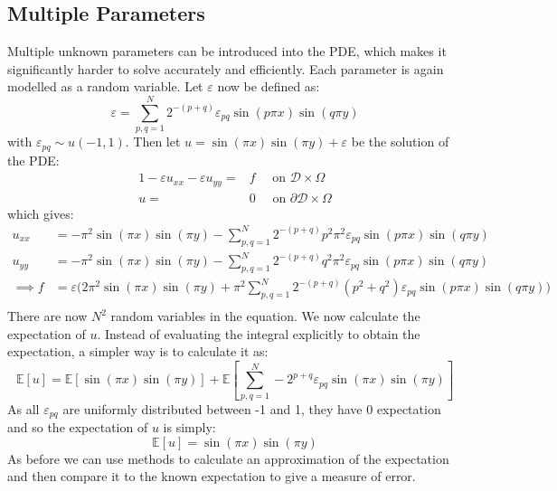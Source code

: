 \documentclass[11pt]{article}
\numberwithin{equation}{section}
\begin{document}
\subsection{Multiple Parameters}
Multiple unknown parameters can be introduced into the PDE, which makes it significantly harder to solve accurately and efficiently. Each parameter is again modelled as a random variable. Let $\varepsilon$ now be defined as:
\begin{equation}
\varepsilon = \sum_{p,q = 1}^N 2^{-(p+q)} \varepsilon_{pq} \sin(p \pi x) \sin(q \pi y)
\end{equation}
with $\varepsilon_{pq} \sim u(-1,1)$. Then let $u = \sin(\pi x)\sin(\pi y) + \varepsilon$ be the solution of the PDE:
\begin{alignat}{1}
-\varepsilon u_{xx} -\varepsilon u_{yy} = {}& f \quad \text{ on } \mathcal{D} \times \Omega \nonumber \\
u = {}& 0 \quad \text{ on } \partial \mathcal{D} \times \Omega
\end{alignat}
which gives:
\begin{equation}
\begin{split}
u_{xx} &= -\pi^2 \sin(\pi x)\sin(\pi y) - \sum_{p,q=1}^N 2^{-(p+q)} p^2 \pi^2 \varepsilon_{pq} \sin(p\pi x)\sin(q\pi y) \\
u_{yy} &= -\pi^2 \sin(\pi x)\sin(\pi y) - \sum_{p,q=1}^N 2^{-(p+q)} q^2 \pi^2 \varepsilon_{pq} \sin(p\pi x)\sin(q\pi y) \\
\implies f &= \varepsilon \Big(2\pi^2 \sin(\pi x) \sin(\pi y) + \pi^2 \sum_{p,q=1}^N 2^{-(p+q)} (p^2 + q^2) \varepsilon_{pq} \sin(p \pi x)\sin(q \pi y) \Big) \\
\end{split}
\end{equation}
There are now $N^2$ random variables in the equation. We now calculate the expectation of $u$. Instead of evaluating the integral explicitly to obtain the expectation, a simpler way is to calculate it as:
\begin{equation}
\mathbb{E}[u] = \mathbb{E}[\sin(\pi x)\sin(\pi y)] + \mathbb{E}\left[\sum_{p,q=1}^N -2^{p+q} \varepsilon_{pq} \sin(\pi x)\sin(\pi y) \right]
\end{equation}
As all $\varepsilon_{pq}$ are uniformly distributed between -1 and 1, they have 0 expectation and so the expectation of $u$ is simply:
\begin{equation}
\mathbb{E}[u] = \sin(\pi x)\sin(\pi y)
\end{equation}
As before we can use methods to calculate an approximation of the expectation and then compare it to the known expectation to give a measure of error.
\end{document}
